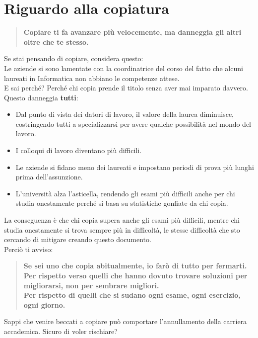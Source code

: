 \documentclass{article}
\begin{document}
\section{Riguardo alla copiatura}
\begin{quote}
\textbf{Copiare ti fa avanzare più velocemente, ma danneggia gli altri oltre che te stesso.}
\end{quote}
Se stai pensando di copiare, considera questo:\\
Le aziende si sono lamentate con la coordinatrice del corso del fatto che alcuni laureati in Informatica non abbiano le competenze attese.\\
E sai perché? Perché chi copia prende il titolo senza aver mai imparato davvero.\\
Questo danneggia \textbf{tutti}:
\begin{itemize}
\item Dal punto di vista dei datori di lavoro, il valore della laurea diminuisce, costringendo tutti a specializzarsi per avere qualche possibilità nel mondo del lavoro.
\item I colloqui di lavoro diventano più difficili.
\item Le aziende si fidano meno dei laureati e impostano periodi di prova più lunghi prima dell'assunzione.
\item L'università alza l'asticella, rendendo gli esami più difficili anche per chi studia onestamente perché si basa su statistiche gonfiate da chi copia.
\end{itemize}
La conseguenza è che chi copia supera anche gli esami più difficili, mentre chi studia onestamente si trova sempre più in difficoltà, le stesse difficoltà che sto cercando di mitigare creando questo documento.\\
Perciò ti avviso:
\begin{quote}
\textbf{Se sei uno che copia abitualmente, io farò di tutto per fermarti.\\
Per rispetto verso quelli che hanno dovuto trovare soluzioni per migliorarsi, non per sembrare migliori.\\
Per rispetto di quelli che si sudano ogni esame, ogni esercizio, ogni giorno.}
\end{quote}
Sappi che venire beccati a copiare può comportare l'annullamento della carriera accademica. Sicuro di voler rischiare?
\end{document}
